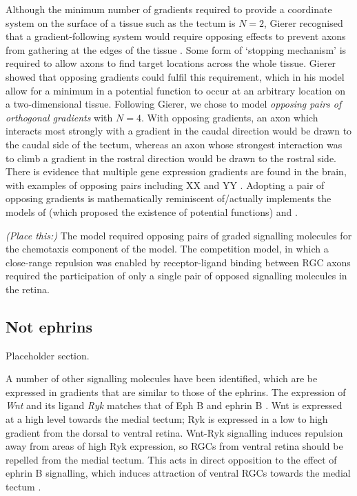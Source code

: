 \documentclass[11pt, a4paper]{article}
\begin{document}
Although the minimum number of gradients required to provide a coordinate system on the surface of a tissue such as the tectum is $N=2$, Gierer recognised that a gradient-following system would require opposing effects to prevent axons from gathering at the edges of the tissue \citep{gierer_model_1983}.
Some form of `stopping mechanism' is required to allow axons to find target locations across the whole tissue. Gierer showed that opposing gradients could fulfil this requirement, which in his model allow for a minimum in a potential function to occur at an arbitrary location on a two-dimensional tissue.
Following Gierer, we chose to model \emph{opposing pairs of orthogonal gradients} with $N=4$.
With opposing gradients, an axon which interacts most strongly with a gradient in the caudal direction would be drawn to the caudal side of the tectum, whereas an axon whose strongest interaction was to climb a gradient in the rostral direction would be drawn to the rostral side.
There is evidence that multiple gene expression gradients are found in the brain, with examples of opposing pairs including XX and YY \citep{cang_developmental_2013}.
Adopting a pair of opposing gradients is mathematically reminiscent of/actually implements the models of \citet{gierer_model_1983} (which proposed the existence of potential functions) and \citet{fraser_differential_1980}.

\emph{(Place this:)} The model required opposing pairs of graded signalling molecules for the chemotaxis component of the model.
The competition model, in which a close-range repulsion was enabled by receptor-ligand binding between RGC axons required the participation of only a single pair of opposed signalling molecules in the retina.

\subsection*{Not ephrins}

Placeholder section.

A number of other signalling molecules have been identified, which are be expressed in gradients that are similar to those of the ephrins.
The expression of \emph{Wnt} and its ligand \emph{Ryk} matches that of Eph B and ephrin B \citep{schmitt_wntryk_2006}.
Wnt is expressed at a high level towards the medial tectum; Ryk is expressed in a low to high gradient from the dorsal to ventral retina.
Wnt-Ryk signalling induces repulsion away from areas of high Ryk expression, so RGCs from ventral retina should be repelled from the medial tectum.
This acts in direct opposition to the effect of ephrin B signalling, which induces attraction of ventral RGCs towards the medial tectum \citep{hindges_ephb_2002}.
\end{document}
